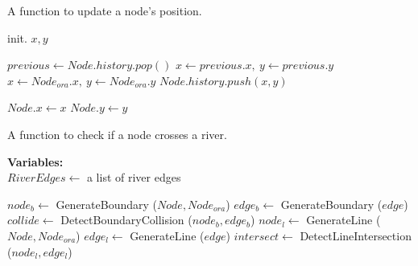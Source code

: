 \begin{algorithm}[hbt!]
    \caption{A function to update a node's position.}\label{alg:move position}
    \begin{algorithmic}[1]
            \State {}
        \EndIf
        
        \State init. $ x,y $

            \State $previous \gets Node.history.pop() $
            \State $ x \gets previous.x,~y \gets previous.y $
        \Else
            \State $ x \gets Node_{ora}.x,~y \gets Node_{ora}.y $
            \State $ Node.history.push(x, y) $
        \EndIf

        \State $ Node.x \gets x $
        \State $ Node.y \gets y $
        \State {}
        \EndFunction
    \end{algorithmic}
\end{algorithm}

\begin{algorithm}[hbt!]
    \caption{A function to check if a node crosses a river.}\label{alg:check river crossing}
    \textbf{Variables:} \\
    $RiverEdges \gets$ a list of river edges \\

    \begin{algorithmic}[1]
                \State $ node_b \gets $ GenerateBoundary ($ Node, Node_{ora} $)
                \State $ edge_b \gets $ GenerateBoundary ($ edge $)
                \State $ collide \gets $ DetectBoundaryCollision ($ node_b, edge_b $)
                    \State $ node_l \gets $ GenerateLine ($ Node, Node_{ora} $)
                    \State $ edge_l \gets $ GenerateLine ($ edge $)
                    \State $ intersect \gets $ DetectLineIntersection ($ node_l, edge_l $)
                        \State {}
                    \EndIf
                \EndIf
            \EndFor
            \State {}
        \EndFunction
    \end{algorithmic}
\end{algorithm}


